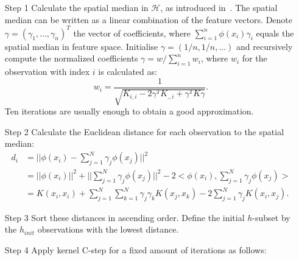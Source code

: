 \documentclass[preprint,12pt]{elsarticle}
\begin{document}
	\begin{itemize}
		\item [Step 1] Calculate the spatial median in $\mathcal{H}$, as introduced in~\cite{debruyne2010detecting}. The spatial median can be written as a linear combination of the feature vectors. Denote $\gamma = (\gamma_1, \dots, \gamma_n)^T$ the vector of coefficients, where  $\sum_{i=1}^{n} \phi(x_i) \gamma_i$ equals the spatial median in feature space. Initialise $\gamma = (1/n, 1/n, \dots)$ and recursively compute the normalized coefficients $\gamma = w / \sum_{i=1}^{n}w_i$, where $w_i$ for the observation with index $i$ is calculated as:
		\begin{equation}
		w_i = \frac{1}{\sqrt{ K_{i,i} - 2 \gamma^T K_{., i} + \gamma^T K \gamma}}.
		\end{equation}
		Ten iterations are usually enough to obtain a good approximation.	
		\item [Step 2] Calculate the Euclidean distance for each observation to the spatial median:
		\begin{align}
		d_i &= || \phi(x_i) - \sum_{j=1}^N \gamma_j \phi(x_j)||^2 \\
		&= || \phi(x_i)||^2 + || \sum_{j=1}^N \gamma_j \phi(x_j)||^2 - 2 <\phi(x_i),\sum_{j=1}^N \gamma_j \phi(x_j)> \\
		&= K(x_i,x_i) + \sum_{j=1}^N \sum_{k=1}^N \gamma_j \gamma_k K(x_j,x_k) - 2 \sum_{j=1}^N\gamma_j K(x_i,x_j).
		\end{align}
		\item [Step 3] 	Sort these distances in ascending order. Define the initial $h$-subset by the $h_{init}$ observations with the lowest distance.	
		
		\item [Step 4] Apply kernel C-step for a fixed amount of iterations as follows:
		

\end{itemize}
\end{document}
